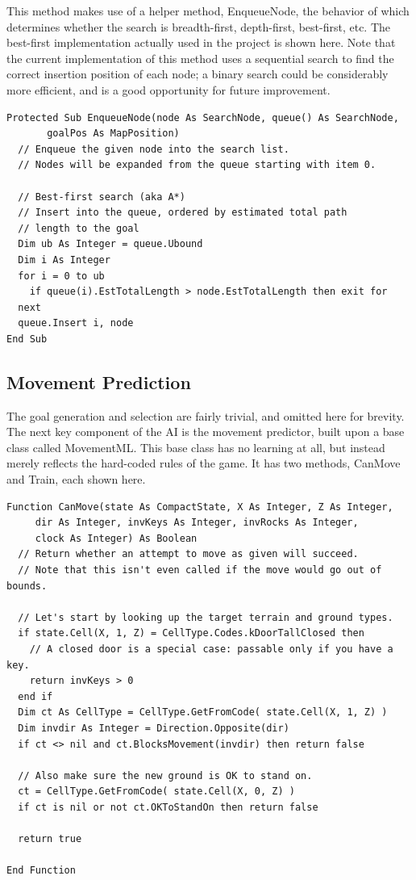 \documentclass{article}
\begin{document}
This method makes use of a helper method, EnqueueNode, the behavior of which determines whether the search is breadth-first, depth-first, best-first, etc.  The best-first implementation actually used in the project is shown here.  Note that the current implementation of this method uses a sequential search to find the correct insertion position of each node; a binary search could be considerably more efficient, and is a good opportunity for future improvement.

\begin{lstlisting}
Protected Sub EnqueueNode(node As SearchNode, queue() As SearchNode,
       goalPos As MapPosition)
  // Enqueue the given node into the search list.
  // Nodes will be expanded from the queue starting with item 0.

  // Best-first search (aka A*)
  // Insert into the queue, ordered by estimated total path
  // length to the goal    
  Dim ub As Integer = queue.Ubound
  Dim i As Integer
  for i = 0 to ub
    if queue(i).EstTotalLength > node.EstTotalLength then exit for
  next
  queue.Insert i, node
End Sub
\end{lstlisting}

\subsection{Movement Prediction}

The goal generation and selection are fairly trivial, and omitted here for brevity.  The next key component of the AI is the movement predictor, built upon a base class called MovementML.  This base class has no learning at all, but instead merely reflects the hard-coded rules of the game.  It has two methods, CanMove and Train, each shown here.

\begin{lstlisting}
Function CanMove(state As CompactState, X As Integer, Z As Integer,
     dir As Integer, invKeys As Integer, invRocks As Integer,
     clock As Integer) As Boolean
  // Return whether an attempt to move as given will succeed.
  // Note that this isn't even called if the move would go out of bounds.
  
  // Let's start by looking up the target terrain and ground types.
  if state.Cell(X, 1, Z) = CellType.Codes.kDoorTallClosed then
    // A closed door is a special case: passable only if you have a key.
    return invKeys > 0
  end if
  Dim ct As CellType = CellType.GetFromCode( state.Cell(X, 1, Z) )
  Dim invdir As Integer = Direction.Opposite(dir)
  if ct <> nil and ct.BlocksMovement(invdir) then return false
  
  // Also make sure the new ground is OK to stand on.
  ct = CellType.GetFromCode( state.Cell(X, 0, Z) )
  if ct is nil or not ct.OKToStandOn then return false
  
  return true
  
End Function
\end{lstlisting}
\end{document}
